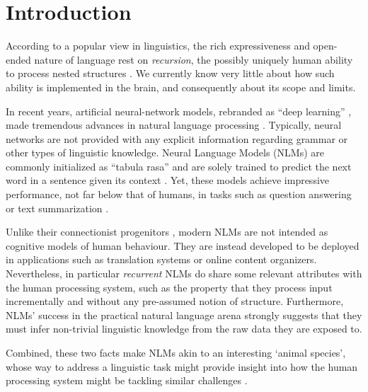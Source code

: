 \section{Introduction}

According to a popular view in linguistics, the rich expressiveness and open-ended nature of language rest on \emph{recursion}, the possibly uniquely human ability to process nested structures \citep{Chomsky:1957, Hauser:etal:2002, Dehaene:etal:2015}. 
We currently know very little about how such ability is implemented in the brain, and consequently about its scope and limits.

In recent years, artificial neural-network models, rebranded as ``deep learning'' \citep{LeCun:etal:2015}, made tremendous advances in natural language processing \citep{Goldberg:2017}. Typically, neural networks are not provided with any explicit information regarding grammar or other types of linguistic knowledge. Neural Language Models (NLMs) are commonly initialized as ``tabula rasa'' and are solely trained to predict the next word in a sentence given its context \citep{Elman:1990}. Yet, these models achieve impressive performance, not far below that of humans, in tasks such as question answering or text summarization \citep{Radford:etal:2019}. 

Unlike their connectionist progenitors \citep{Rumelhart:etal:1986,Rumelhart:etal:1986b}, modern NLMs are not intended as cognitive models of human behaviour. 
They are instead developed to be deployed in applications such as translation systems or online content organizers. 
Nevertheless, in particular \emph{recurrent} NLMs do share some relevant attributes with the human processing system, such as the property that they process input incrementally and without any pre-assumed notion of structure.
Furthermore, NLMs' success in the practical natural language arena strongly suggests that they must infer non-trivial linguistic knowledge from the raw data they are exposed to. %

Combined, these two facts make NLMs akin to an interesting `animal species', whose way to address a linguistic task might provide insight into how the human processing system might be tackling similar challenges \citep[see also][]{McCloskey:1991}.

